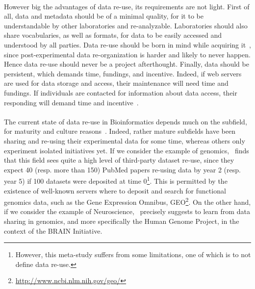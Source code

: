 \paragraph*{}
However big the advantages of data re-use, its requirements are not light. First of all, data and metadata should be of a minimal quality, for it to be understandable by other laboratories and re-analyzable. Laboratories should also share vocabularies, as well as formats, for data to be easily accessed and understood by all parties. Data re-use should be born in mind while acquiring it~\cite{pmid23047157}, since post-experimental data re-organization is harder and likely to never happen. Hence data re-use should never be a project afterthought. Finally, data should be persistent, which demands time, fundings, and incentive. Indeed, if web servers are used for data storage and access, their maintenance will need time and fundings. If individuals are contacted for information about data access, their responding will demand time and incentive~\cite{pmid18636105}.

\paragraph*{} The current state of data re-use in Bioinformatics depends much on the subfield, for maturity and culture reasons~\cite{pmid24904347}. Indeed, rather mature subfields have been sharing and re-using their experimental data for some time, whereas others only experiment isolated initiatives yet. If we consider the example of genomics,~\cite{pmid24109559} finds that this field sees quite a high level of third-party dataset re-use, since they expect 40 (resp. more than 150) PubMed papers re-using data by year 2 (resp. year 5) if 100 datasets were deposited at time 0\footnote{However, this meta-study suffers from some limitations, one of which is to not define data re-use.}. This is permitted by the existence of well-known servers where to deposit and search for functional genomics data, such as the Gene Expression Omnibus,  GEO\footnote{\href{http://www.ncbi.nlm.nih.gov/geo/}{http://www.ncbi.nlm.nih.gov/geo/}}. On the other hand, if we consider the example of Neuroscience,~\cite{pmid24904347} precisely suggests to learn from data sharing in genomics, and more specifically the Human Genome Project, in the context of the BRAIN Initiative. %

